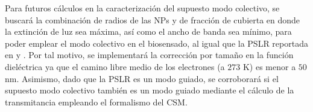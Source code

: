 Para futuros cálculos en la caracterización del supuesto modo colectivo, se buscará la combinación de radios de las NPs y de fracción de cubierta en donde la extinción de luz sea máxima, así como el ancho de banda sea mínimo, para poder emplear el modo colectivo en el biosensado, al igual que la PSLR reportada en \cite{kabashin2009plasmonic} y \cite{danilov2018ultra}. Por tal motivo, se implementará la corrección por tamaño en la función dieléctrica ya que el camino libre medio de los electrones (a $273$ K) es menor a $50$ nm. Asimismo, dado que la PSLR es un modo guiado, se corroborará si el supuesto modo colectivo también es un modo guiado mediante el cálculo de la transmitancia empleando el formalismo del CSM.

